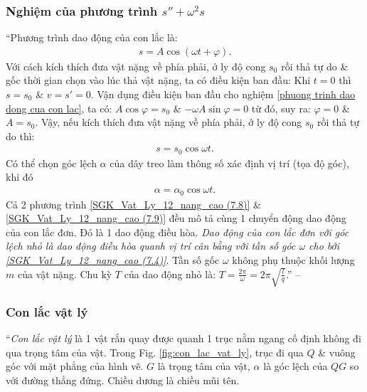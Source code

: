 \documentclass{article}
\numberwithin{equation}{section}
\begin{document}
\subsubsection{Nghiệm của phương trình $s'' + \omega^2s$}
``Phương trình dao động của con lắc là:
\begin{align}
	\label{phuong trinh dao dong cua con lac}
	s = A\cos(\omega t + \varphi).
\end{align}
Với cách kích thích đưa vật nặng về phía phải, ở ly độ cong $s_0$ rồi thả tự do \& gốc thời gian chọn vào lúc thả vật nặng, ta có điều kiện ban đầu: Khi $t = 0$ thì $s = s_0$ \& $v = s' = 0$. Vận dụng điều kiện ban đầu cho nghiệm \eqref{phuong trinh dao dong cua con lac}, ta có: $A\cos\varphi = s_0$ \& $-\omega A\sin\varphi = 0$ từ đó, suy ra: $\varphi = 0$ \& $A = s_0$. Vậy, nếu kích thích đưa vật nặng về phía phải, ở ly độ cong $s_0$ rồi thả tự do thì:
\begin{align}
	\label{SGK_Vat_Ly_12_nang_cao (7.8)}
	s = s_0\cos\omega t.
\end{align}
Có thể chọn góc lệch $\alpha$ của dây treo làm thông số xác định vị trí (tọa độ góc), khi đó
\begin{align}
	\label{SGK_Vat_Ly_12_nang_cao (7.9)}
	\alpha = \alpha_0\cos\omega t.
\end{align}
Cả 2 phương trình \eqref{SGK_Vat_Ly_12_nang_cao (7.8)} \& \eqref{SGK_Vat_Ly_12_nang_cao (7.9)} đều mô tả cùng 1 chuyển động dao động của con lắc đơn. Đó là 1 dao động điều hòa. \textit{Dao động của con lắc đơn với góc lệch nhỏ là dao động điều hòa quanh vị trí cân bằng với tần số góc $\omega$ cho bởi \eqref{SGK_Vat_Ly_12_nang_cao (7.4)}}. Tần số gốc $\omega$ không phụ thuộc khối lượng $m$ của vật nặng. Chu kỳ $T$ của dao động nhỏ là: $T = \frac{2\pi}{\omega} = 2\pi\sqrt{\frac{l}{q}}$.'' -- \cite[pp. 37--38]{SGK_Vat_Ly_12_nang_cao}

\subsubsection{Con lắc vật lý}
``\textit{Con lắc vật lý} là 1 vật rắn quay được quanh 1 trục nằm ngang cố định không đi qua trọng tâm của vật. Trong Fig. \ref{fig:con_lac_vat_ly}, trục đi qua $Q$ \& vuông góc với mặt phẳng của hình vẽ. $G$ là trọng tâm của vật, $\alpha$ là góc lệch của $QG$ so với đường thẳng đứng. Chiều dương là chiều mũi tên.
\end{document}
